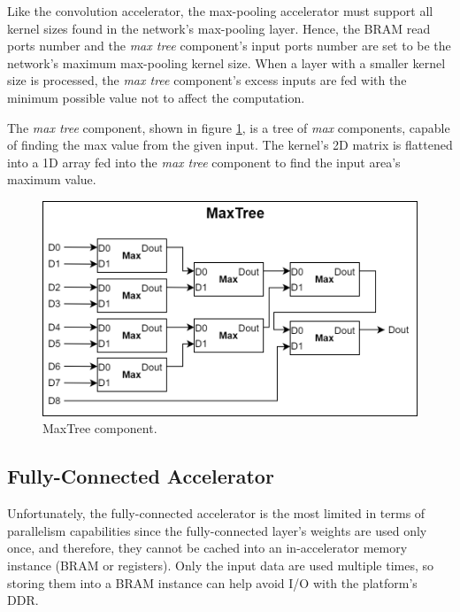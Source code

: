 Like the convolution accelerator, the max-pooling accelerator must support all kernel sizes found in the network's max-pooling layer. Hence, the BRAM read ports number and the \emph{max tree} component's input ports number are set to be the network's maximum max-pooling kernel size. When a layer with a smaller kernel size is processed, the \emph{max tree} component's excess inputs are fed with the minimum possible value not to affect the computation.

The \emph{max tree} component, shown in figure \ref{fig:max-tree-component}, is a tree of \emph{max} components, capable of finding the max value from the given input. The kernel's 2D matrix is flattened into a 1D array fed into the \emph{max tree} component to find the input area's maximum value.

\begin{figure} [H]
	\centering
	\includegraphics[width=\textwidth]{../Images/Platform/MaxTree_component.png}
	\decoRule
	\caption[MaxTree component]{MaxTree component.}
	\label{fig:max-tree-component}
\end{figure}

\subsection{Fully-Connected Accelerator}
Unfortunately, the fully-connected accelerator is the most limited in terms of parallelism capabilities since the fully-connected layer's weights are used only once, and therefore, they cannot be cached into an in-accelerator memory instance (BRAM or registers). Only the input data are used multiple times, so storing them into a BRAM instance can help avoid I/O with the platform's DDR.

